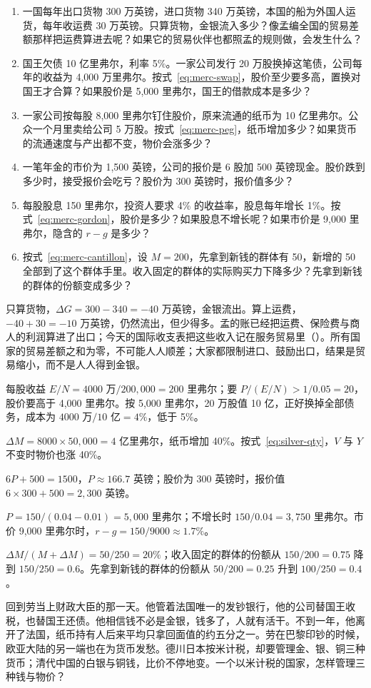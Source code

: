 \begin{selfcheck}
\begin{enumerate}
\item 一国每年出口货物 300 万英镑，进口货物 340 万英镑，本国的船为外国人运货，每年收运费 30 万英镑。只算货物，金银流入多少？像孟编全国的贸易差额那样把运费算进去呢？如果它的贸易伙伴也都照孟的规则做，会发生什么？
\item 国王欠债 10 亿里弗尔，利率 5\%。一家公司发行 20 万股换掉这笔债，公司每年的收益为 4,000 万里弗尔。按式~\eqref{eq:merc-swap}，股价至少要多高，置换对国王才合算？如果股价是 5,000 里弗尔，国王的借款成本是多少？
\item 一家公司按每股 8,000 里弗尔钉住股价，原来流通的纸币为 10 亿里弗尔。公众一个月里卖给公司 5 万股。按式~\eqref{eq:merc-peg}，纸币增加多少？如果货币的流通速度与产出都不变，物价会涨多少？
\item 一笔年金的市价为 1,500 英镑，公司的报价是 6 股加 500 英镑现金。股价跌到多少时，接受报价会吃亏？股价为 300 英镑时，报价值多少？
\item 每股股息 150 里弗尔，投资人要求 4\% 的收益率，股息每年增长 1\%。按式~\eqref{eq:merc-gordon}，股价是多少？如果股息不增长呢？如果市价是 9,000 里弗尔，隐含的 $r-g$ 是多少？
\item 按式~\eqref{eq:merc-cantillon}，设 $M=200$，先拿到新钱的群体有 50，新增的 50 全部到了这个群体手里。收入固定的群体的实际购买力下降多少？先拿到新钱的群体的份额变成多少？
\end{enumerate}
\end{selfcheck}

\begin{answers}
\item 只算货物，$\Delta G=300-340=-40$ 万英镑，金银流出。算上运费，$-40+30=-10$ 万英镑，仍然流出，但少得多。孟的账已经把运费、保险费与商人的利润算进了出口；今天的国际收支表把这些收入记在服务贸易里（）。所有国家的贸易差额之和为零，不可能人人顺差；大家都限制进口、鼓励出口，结果是贸易缩小，而不是人人得到金银。
\item 每股收益 $E/N=4000\text{ 万}/200{,}000=200$ 里弗尔；要 $P/(E/N)>1/0.05=20$，股价要高于 4,000 里弗尔。按 5,000 里弗尔，20 万股值 10 亿，正好换掉全部债务，成本为 $4000\text{ 万}/10\text{ 亿}=4\%$，低于 5\%。
\item $\Delta M=8000\times50{,}000=4$ 亿里弗尔，纸币增加 40\%。按式~\eqref{eq:silver-qty}，$V$ 与 $Y$ 不变时物价也涨 40\%。
\item $6P+500=1500$，$P\approx166.7$ 英镑；股价为 300 英镑时，报价值 $6\times300+500=2{,}300$ 英镑。
\item $P=150/(0.04-0.01)=5{,}000$ 里弗尔；不增长时 $150/0.04=3{,}750$ 里弗尔。市价 9,000 里弗尔时，$r-g=150/9000\approx1.7\%$。
\item $\Delta M/(M+\Delta M)=50/250=20\%$；收入固定的群体的份额从 $150/200=0.75$ 降到 $150/250=0.6$。先拿到新钱的群体的份额从 $50/200=0.25$ 升到 $100/250=0.4$。
\end{answers}

回到劳当上财政大臣的那一天。他管着法国唯一的发钞银行，他的公司替国王收税，也替国王还债。他相信钱不必是金银，钱多了，人就有活干。不到一年，他离开了法国，纸币持有人后来平均只拿回面值的约五分之一。劳在巴黎印钞的时候，欧亚大陆的另一端也在为货币发愁。德川日本按米计税，却要管理金、银、铜三种货币；清代中国的白银与铜钱，比价不停地变。一个以米计税的国家，怎样管理三种钱与物价？
